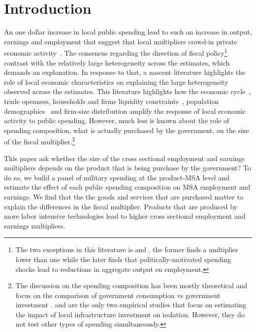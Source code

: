 \documentclass[dv_diss_main.tex]{subfiles}
\begin{document}
\section{Introduction}
\label{sec:into}

An one dollar increase in local public spending lead to such an increase in output, earnings and employment that suggest that local multipliers crowd-in private economic activity~\cite{chodorow2019geographic}. The consensus regarding the direction of fiscal policy\footnote{The two exceptions in this literature is \cite{Dupor2017} and \cite{cohen2011powerful}, the former finds a multiplier lower than one while the later finds that politically-motivated spending shocks lead to reductions in aggregate output en employment.} contrast with the relatively large heterogeneity across the estimates, which demands an explanation. In response to that, a nascent literature highlights the role of local economic characteristics on explaining the large heterogeneity observed across the estimates. This literature highlights how the economic cycle~\citep{cohen2011powerful, serrato2016estimating,buchheim2020job}, trade openness\citep{corbi2019regional}, households and firms liquidity constraints~\citep{Demyanyk2019,auerbach2020effects, bruckner2014local}, population demographics~\citep{basso2021young} and firm-size distribution \citep{Juarros2021} amplify the response of local economic activity to public spending. However, much less is known about the role of spending composition, what is actually purchased by the government, on the size of the fiscal multiplier.\footnote{The discussion on the spending composition has been mostly theoretical and focus on the comparison of government consumption vs government investment \citep{Boehm2020,ramey2020macroeconomic}. \cite{garin2019putting} and \cite{buchheim2017employment} are the only two empirical studies that focus on estimating the impact of local infrastructure investment on isolation. However, they do not test other types of spending simultaneously.} 


This paper ask whether the size of the cross sectional employment and earnings multipliers depends on the product that is being purchase by the government? To do so, we build a panel of military spending at the product-MSA level and estimate the effect of each public spending composition on MSA employment and earnings. We find that the the goods and services that are purchased matter to explain the differences in the fiscal multiplier. Products that are produced by more labor intensive technologies lead to higher cross sectional  employment and earnings multipliers. 
\end{document}
